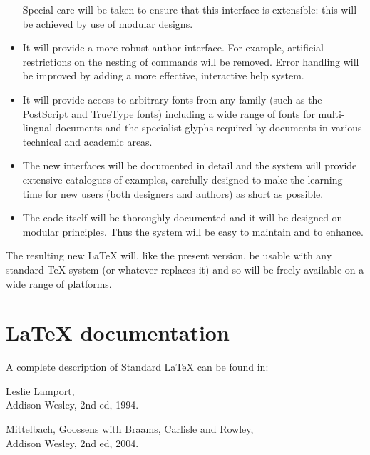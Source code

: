 \documentclass[a4paper]{article}
\newenvironment{citations}{%
   \list{}{%
      \renewcommand{\makelabel}[1]{\normalfont\itshape ##1}%
   }%
}{%
   \endlist
}
\newcommand{\AW}{Addison Wesley}
\newcommand{\PS}{{\sc Post\-Script}}
\begin{document}
\begin{itemize}
\begin{itemize}
 \end{itemize}

 Special care will be taken to ensure that this interface is
 extensible: this will be achieved by use of modular designs.
 
 
  \item
  It will provide a more robust author-interface. For example,
  artificial restrictions on the nesting of commands will be removed.
  Error handling will be improved by adding
  a more effective, interactive help system.
 
  \item
  It will provide access to arbitrary fonts from any family (such as
  the \PS{} and TrueType fonts) including a wide range of fonts for
  multi-lingual documents and the specialist glyphs required by
  documents in various technical and academic areas.

  \item
  The new interfaces will be documented in detail and the
  system will provide extensive catalogues of examples, carefully
  designed to make the learning time for new users (both designers and
  authors) as short as possible.
 
 \item
  The code itself will be thoroughly documented and it will be
  designed on modular principles.  Thus the system will be easy to
  maintain and to enhance.
\end{itemize}
 
The resulting new \LaTeX{} will, like the present version, be usable
with any standard \TeX{} system (or whatever replaces it) and so will
be freely available on a wide range of platforms.
  

\section{\LaTeX{} documentation}

\begingroup
\setlength{\parindent}{0pt}

A complete description of Standard \LaTeX{} can be found in:
\begin{citations}
\item[\LaTeX: A Document Preparation System]
   Leslie Lamport,\\ \AW, 2nd ed, 1994.
\item[The \LaTeX{} Companion]
   Mittelbach, Goossens with Braams, Carlisle and Rowley,\\ \AW, 2nd ed, 2004.
\end{citations}
\end{document}
